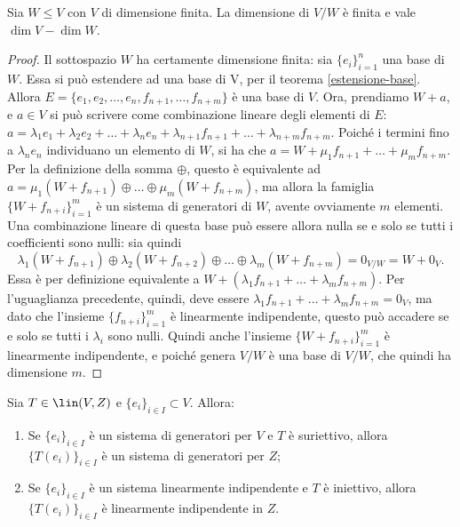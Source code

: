 \begin{teorema} \label{t:dimensione-quoziente}
	Sia $W\leq V$ con $V$ di dimensione finita.
	La dimensione di $V/W$ è finita e vale $\dim V-\dim W$.
\end{teorema}
\begin{proof}
	Il sottospazio $W$ ha certamente dimensione finita: sia $\{  e_i\}_{i=1}^n$ una base di $W$.
	Essa si può estendere ad una base di V, per il teorema \ref{estensione-base}.
	Allora $E=\{  e_1,  e_2,\dots,  e_n,  f_{n+1},\dots,  f_{n+m}\}$ è una base di $V$.
	Ora, prendiamo $W+  a$, e $  a\in V$ si può scrivere come combinazione lineare degli elementi di $E$: $  a=\lambda_1  e_1+\lambda_2  e_2+\dots+\lambda_n  e_n+\lambda_{n+1}  f_{n+1}+\dots+\lambda_{n+m}  f_{n+m}$.
	Poiché i termini fino a $\lambda_n  e_n$ individuano un elemento di $W$, si ha che $a=W+\mu_1  f_{n+1}+\dots+\mu_m  f_{n+m}$.
	Per la definizione della somma $\oplus$, questo è equivalente ad $a=\mu_1(W+  f_{n+1})\oplus\dots\oplus\mu_m(W+  f_{n+m})$, ma allora la famiglia $\{W+  f_{n+i}\}_{i=1}^m$ è un sistema di generatori di $W$, avente ovviamente $m$ elementi.
	Una combinazione lineare di questa base può essere allora nulla se e solo se tutti i coefficienti sono nulli: sia quindi
	\begin{equation*}
		\lambda_1(W+  f_{n+1})\oplus\lambda_2(W+  f_{n+2})\oplus\dots\oplus\lambda_m(W+  f_{n+m})=0_{V/W}=W+0_V.
	\end{equation*}
	Essa è per definizione equivalente a $W+(\lambda_1  f_{n+1}+\dots+\lambda_m  f_{n+m})$.
	Per l'uguaglianza precedente, quindi, deve essere $\lambda_1  f_{n+1}+\dots+\lambda_m  f_{n+m}=0_V$, ma dato che l'insieme $\{  f_{n+i}\}_{i=1}^m$ è linearmente indipendente, questo può accadere se e solo se tutti i $\lambda_i$ sono nulli.
	Quindi anche l'insieme $\{W+  f_{n+i}\}_{i=1}^m$ è linearmente indipendente, e poiché genera $V/W$ è una base di $V/W$, che quindi ha dimensione $m$.
\end{proof}
\begin{teorema}
	Sia $T\in\lin(V,Z)$ e $\{  e_i\}_{i\in I}\subset V$.
	Allora:
	\begin{enumerate}
		\item Se $\{  e_i\}_{i\in I}$ è un sistema di generatori per $V$ e $T$ è suriettivo, allora $\{T(  e_i)\}_{i\in I}$ è un sistema di generatori per $Z$;
		\item Se $\{  e_i\}_{i\in I}$ è un sistema linearmente indipendente e $T$ è iniettivo, allora $\{T(  e_i)\}_{i\in I}$ è linearmente indipendente in $Z$.
	\end{enumerate}
\end{teorema}
